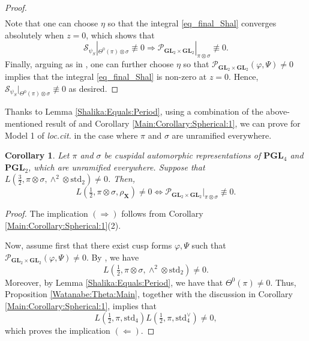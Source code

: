 \documentclass[11pt, reqno]{amsart}
\theoremstyle{plain}
\newtheorem{corollary}[theorem]{Corollary}
\theoremstyle{definition}
\theoremstyle{remark}
\theoremstyle{plain}
\def\GL{\mathbf{GL}}
\begin{document}
\begin{proof}
\begin{align}
    \end{align}
    Note that one can choose $\eta$ so that the integral \eqref{eq_final_Shal} converges absolutely when $z = 0$, which shows that  
    $$\mathcal{S}_{\psi_S}|_{\Theta^0(\pi) \otimes \sigma}  \not \equiv 0 \Longrightarrow {\mathcal{P}_{ \GL_2 \times \GL_2}}|_{\pi \otimes \sigma} \not \equiv 0.$$
    Finally, arguing as in \cite[Proposition 7.1]{Chen-Gan}, one can further choose $\eta$ so that  $\mathcal{P}_{\GL_2\times\GL_2}(\varphi,\Psi)\neq 0$ implies that the integral \eqref{eq_final_Shal} is non-zero at $z=0$. Hence, $\mathcal{S}_{\psi_S}|_{\Theta^0(\pi) \otimes \sigma}  \not \equiv 0$ as desired. 
\end{proof}


Thanks to Lemma \ref{Shalika:Equals:Period}, using a combination of the above-mentioned result of \cite{Pollack:Wan:Zydor} and Corollary \ref{Main:Corollary:Spherical:1}, we can prove \cite[Conjecture 1.9]{Wan:Zhang:Spherical:Periods} for Model 1 of \emph{loc.cit.} in the case where $\pi$ and $\sigma$ are unramified everywhere.

\begin{corollary}\label{Main:Corollary:Spherical:2}
     Let $\pi$ and $\sigma$ be cuspidal automorphic representations of $\mathbf{PGL}_4$ and $\mathbf{PGL}_2$, which are unramified everywhere. Suppose that $L(\frac{3}{2},\pi \otimes \sigma,\wedge^2\otimes\mathrm{std}_2)\neq 0$. Then,
\[L( \tfrac{1}{2}, \pi \otimes \sigma, \rho_{\mathbf{X}}) \neq 0 \Longleftrightarrow {\mathcal{P}_{ \GL_2 \times \GL_2}}|_{\pi \otimes \sigma} \not \equiv 0.\]
\end{corollary} 
     
\begin{proof}
The implication $(\Longrightarrow)$ follows from Corollary \ref{Main:Corollary:Spherical:1}(2). 

Now, assume first that there exist cusp forms $\varphi,\Psi$ such that $\mathcal{P}_{ \GL_2 \times \GL_2}(\varphi,\Psi)\neq 0$. By \cite[Corollary 1.3(6)]{Pollack:Wan:Zydor}, we have  \[L(\tfrac{1}{2},\pi \otimes \sigma,\wedge^2 \otimes \mathrm{std}_2)\neq 0.\] 
Moreover, by Lemma \ref{Shalika:Equals:Period}, we have that $\Theta^0(\pi)\neq 0$. Thus, Proposition \ref{Watanabe:Theta:Main}, together with the discussion in Corollary \ref{Main:Corollary:Spherical:1}, implies that \[L( \tfrac{1}{2},\pi,\mathrm{std}_4)L( \tfrac{1}{2},\pi,\mathrm{std}_4^{\vee})\neq 0,\] which proves the implication $(\Longleftarrow)$. 
\end{proof}
     
\end{document}
